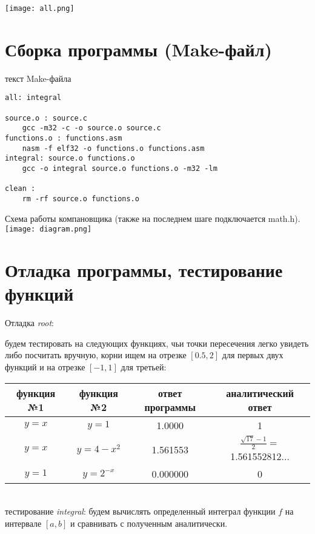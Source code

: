 \documentclass[a4paper,12pt,titlepage,finall]{article}
\begin{document}
\texttt{[image: all.png]}

\newpage

\section{Сборка программы (Make-файл)}
\begin{center}
    текст Make-файла
\end{center}

\begin{lstlisting}
all: integral

source.o : source.c
	gcc -m32 -c -o source.o source.c 
functions.o : functions.asm
	nasm -f elf32 -o functions.o functions.asm
integral: source.o functions.o
	gcc -o integral source.o functions.o -m32 -lm 
	
clean :
	rm -rf source.o functions.o 
\end{lstlisting}

Схема работы компановщика (также на последнем шаге подключается math.h).\\

\texttt{[image: diagram.png]}

\newpage

\section{Отладка программы, тестирование функций}

Отладка \textsl{root}:

будем тестировать на следующих функциях, чьи точки пересечения легко увидеть либо посчитать вручную, корни ищем на отрезке $[0.5, 2]$ для первых двух функций и на отрезке $[-1, 1]$ для третьей:\\

\begin{tabular}{|c|c|c|c|}
    \hline
     функция №1 & функция №2 & ответ программы & аналитический ответ \\
     \hline
     $y = x$ & $y = 1$ & 1.0000 & 1\\
     $y = x$ & $y = 4 - x^2$ & 1.561553 & $\frac{\sqrt{17} - 1}{2}=$ 1.561552812...\\
     $y = 1$ & $y = 2^{-x}$ &  0.000000 & 0\\
     \hline
\end{tabular}\\

тестирование \textsl{integral}:
будем вычислять определенный интеграл функции $f$ на интервале $[a, b]$ и сравнивать с полученным аналитически.\\
\end{document}
